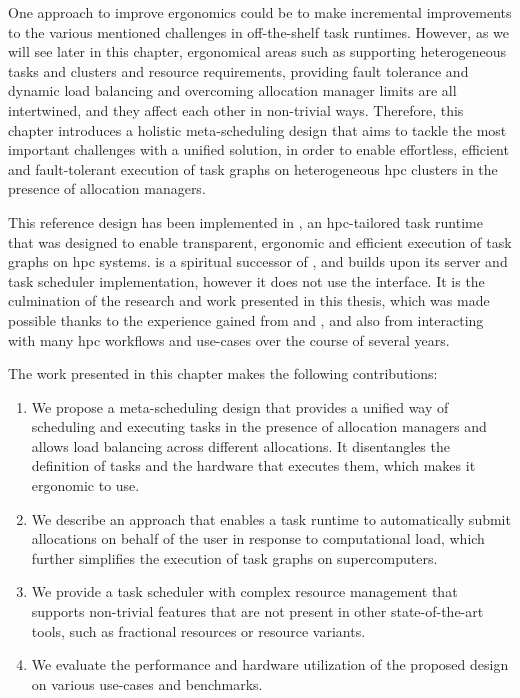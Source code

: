 One approach to improve ergonomics could be to make incremental improvements to the various
mentioned challenges in off-the-shelf task runtimes. However, as we will see later in this chapter,
ergonomical areas such as supporting heterogeneous tasks and clusters and resource requirements,
providing fault tolerance and dynamic load balancing and overcoming allocation manager limits are
all intertwined, and they affect each other in non-trivial ways. Therefore, this chapter introduces
a holistic meta-scheduling design that aims to tackle the most important challenges with a unified
solution, in order to enable effortless, efficient and fault-tolerant execution of task graphs on
heterogeneous \gls{hpc} clusters in the presence of allocation managers.

This reference design has been implemented in \hyperqueue{}, an
\gls{hpc}-tailored task runtime that was designed to enable transparent, ergonomic
and efficient execution of task graphs on \gls{hpc} systems. \hyperqueue{}
is a spiritual successor of \rsds{}, and builds upon its server and task scheduler
implementation, however it does not use the \dask{} interface. It is the
culmination of the research and work presented in this thesis, which was made possible thanks to
the experience gained from \estee{} and \rsds{}, and also from
interacting with many \gls{hpc} workflows and use-cases over the course of several
years.

The work presented in this chapter makes the following contributions:
\begin{enumerate}
	\item We propose a meta-scheduling design that provides a unified way of scheduling and executing tasks
	      in the presence of allocation managers and allows load balancing across different allocations. It
	      disentangles the definition of tasks and the hardware that executes them, which makes it ergonomic
	      to use.
	\item We describe an approach that enables a task runtime to automatically submit allocations on behalf
	      of the user in response to computational load, which further simplifies the execution of task
	      graphs on supercomputers.
	\item We provide a task scheduler with complex resource management that supports non-trivial features
	      that are not present in other state-of-the-art tools, such as fractional resources or resource
	      variants.
	\item We evaluate the performance and hardware utilization of the proposed design on various use-cases
	      and benchmarks.
\end{enumerate}

